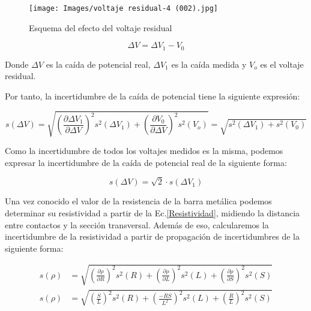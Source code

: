 \documentclass[a4paper,12pt,titlepage]{article}
\begin{document}
\begin{figure}[h!]
    \centering
    \texttt{[image: Images/voltaje residual-4 (002).jpg]}
    \caption{Esquema del efecto del voltaje residual}
\end{figure}

\begin{equation}
    \Delta V = \Delta V_{1} - V_{0}
    \label{Voltaje residual}
\end{equation}

Donde $\Delta V$ es la caída de potencial real, $\Delta V_{1}$ es la caída medida y $V_{o}$ es el voltaje residual.

Por tanto, la incertidumbre de la caída de potencial tiene la siguiente expresión:

\begin{equation}
    s(\Delta V) = \sqrt{\left (\frac{\partial \Delta V_{1}}{\partial \Delta V}\right )^2s^2(\Delta V_{1}) + \left (\frac{\partial V_{0}}{\partial \Delta V}\right )^2s^2(V_{o})} = \sqrt{s^2(\Delta V_{1}) + s^2(V_{0})}
    \label{Inc Voltaje residual}
\end{equation}

Como la incertidumbre de todos los voltajes medidos es la misma, podemos expresar la incertidumbre de la caída de potencial real de la siguiente forma:

\begin{equation}
    s(\Delta V) = \sqrt{2}\cdot s(\Delta V_{1})
    \label{Inc voltaje}
\end{equation}

\par Una vez conocido el valor de la resistencia de la barra metálica podemos determinar su resistividad a partir de la Ec.\ref{Resistividad}, midiendo la distancia entre contactos y la sección transversal. Además de eso, calcularemos la incertidumbre de la resistividad a partir de propagación de incertidumbres de la siguiente forma:

\begin{align}
    s(\rho) &= \sqrt{\left (\frac{\partial \rho}{\partial R}\right )^2s^2(R)  +  \left (\frac{\partial \rho}{\partial L}\right )^2s^2(L)  +  \left (\frac{\partial \rho}{\partial S}\right )^2s^2(S)} \nonumber \\
    s(\rho) &= \sqrt{\left (\frac{S}{L}\right )^2s^2(R)  +  \left (\frac{-RS}{L^2}\right )^2s^2(L)  +  \left (\frac{R}{L}\right )^2s^2(S)}
    \label{Inc resistividad}
\end{align}
\end{document}

